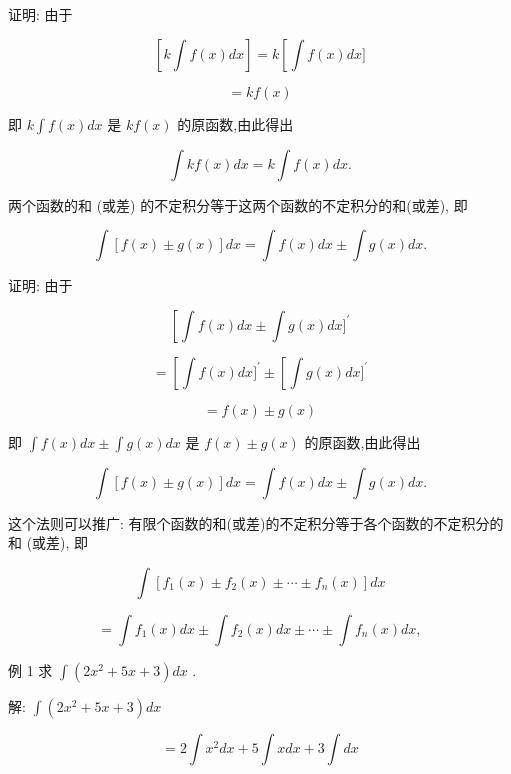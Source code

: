 \documentclass[lang=cn,newtx,10pt,scheme=chinese]{elegantbook}
\begin{document}
证明: 由于

\[
\left\lbrack {k\int f\left( x\right) {dx}}\right\rbrack = k\left\lbrack {\int f\left( x\right) {dx}\rbrack }\right.
\]

\[
= {kf}\left( x\right)
\]

即 \(k\int f\left( x\right) {dx}\) 是 \({kf}\left( x\right)\) 的原函数,由此得出

\[
\int {kf}\left( x\right) {dx} = k\int f\left( x\right) {dx}.
\]

\begin{proposition}[不定积分法则2]

两个函数的和 (或差) 的不定积分等于这两个函数的不定积分的和(或差), 即

\[
\int \left\lbrack {f\left( x\right) \pm g\left( x\right) }\right\rbrack {dx} = \int f\left( x\right) {dx} \pm \int g\left( x\right) {dx}.
\]

\end{proposition}

证明: 由于

\[
\left\lbrack {\int f\left( x\right) {dx} \pm \int g\left( x\right) {dx}{\rbrack }^{\prime }}\right.
\]

\[
= \left\lbrack {\int f\left( x\right) {dx}{\rbrack }^{\prime } \pm \left\lbrack {\int g\left( x\right) {dx}{\rbrack }^{\prime }}\right. }\right.
\]

\[
= f\left( x\right) \pm g\left( x\right)
\]

即 \(\int f\left( x\right) {dx} \pm \int g\left( x\right) {dx}\) 是 \(f\left( x\right) \pm g\left( x\right)\) 的原函数,由此得出

\[
\int \left\lbrack {f\left( x\right) \pm g\left( x\right) }\right\rbrack {dx} = \int f\left( x\right) {dx} \pm \int g\left( x\right) {dx}.
\]

这个法则可以推广: 有限个函数的和(或差)的不定积分等于各个函数的不定积分的和 (或差), 即

\[
\int \left\lbrack {{f}_{1}\left( x\right) \pm {f}_{2}\left( x\right) \pm \cdots \pm {f}_{n}\left( x\right) }\right\rbrack {dx}
\]

\[
= \int {f}_{1}\left( x\right) {dx} \pm \int {f}_{2}\left( x\right) {dx} \pm \cdots \pm \int {f}_{n}\left( x\right) {dx},
\]

例 1 求 \(\int \left( {2{x}^{2} + {5x} + 3}\right) {dx}\) .

解: \(\int \left( {2{x}^{2} + {5x} + 3}\right) {dx}\)

\[
= 2\int {x}^{2}{dx} + 5\int {xdx} + 3\int {dx}
\]
\end{document}
